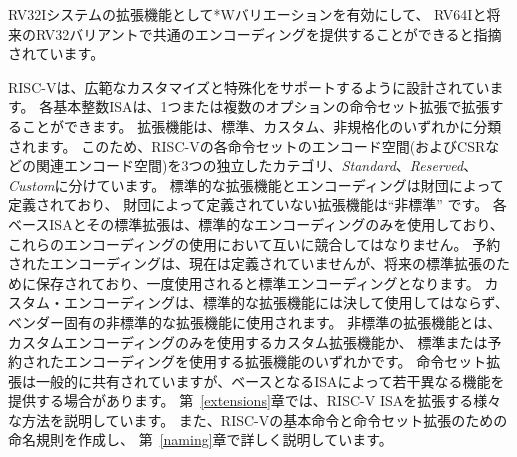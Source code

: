 \begin{commentary}
RV32Iシステムの拡張機能として*Wバリエーションを有効にして、
RV64Iと将来のRV32バリアントで共通のエンコーディングを提供することができると指摘されています。
\end{commentary}

\begin{comment}
RISC-V has been designed to support extensive customization and
specialization.  Each base integer ISA can be extended with one or
more optional instruction-set extensions.  An extension may be
categorized as either standard, custom, or non-conforming.
For this purpose, we divide each RISC-V
instruction-set encoding space (and related encoding spaces such as
the CSRs) into three disjoint categories: {\em standard}, {\em
  reserved}, and {\em custom}.  Standard extensions and encodings
are defined by the Foundation; any extensions not defined by the
Foundation are {\em non-standard}.
Each base ISA and its standard extensions use only standard encodings,
and shall not conflict with each other in their uses of these encodings.
Reserved encodings are currently not defined but are saved for future
standard extensions; once thus used, they become standard encodings.
Custom encodings shall never be used for standard extensions and are
made available for vendor-specific non-standard extensions.
Non-standard extensions are either custom extensions, that use only
custom encodings, or {\em non-conforming} extensions, that use any
standard or reserved encoding.
Instruction-set extensions are generally shared but may provide slightly different
functionality depending on the base ISA.  Chapter~\ref{extensions}
describes various ways of extending the RISC-V ISA.  We have also
developed a naming convention for RISC-V base instructions and
instruction-set extensions, described in detail in
Chapter~\ref{naming}.
\end{comment}

RISC-Vは、広範なカスタマイズと特殊化をサポートするように設計されています。
各基本整数ISAは、1つまたは複数のオプションの命令セット拡張で拡張することができます。
拡張機能は、標準、カスタム、非規格化のいずれかに分類されます。
このため、RISC-Vの各命令セットのエンコード空間(およびCSRなどの関連エンコード空間)を3つの独立したカテゴリ、{\em Standard}、{\em Reserved}、{\em Custom}に分けています。
標準的な拡張機能とエンコーディングは財団によって定義されており、
財団によって定義されていない拡張機能は``非標準'' です。
各ベースISAとその標準拡張は、標準的なエンコーディングのみを使用しており、これらのエンコーディングの使用において互いに競合してはなりません。
予約されたエンコーディングは、現在は定義されていませんが、将来の標準拡張のために保存されており、一度使用されると標準エンコーディングとなります。
カスタム・エンコーディングは、標準的な拡張機能には決して使用してはならず、ベンダー固有の非標準的な拡張機能に使用されます。
非標準の拡張機能とは、カスタムエンコーディングのみを使用するカスタム拡張機能か、
標準または予約されたエンコーディングを使用する拡張機能のいずれかです。
命令セット拡張は一般的に共有されていますが、ベースとなるISAによって若干異なる機能を提供する場合があります。
第~\ref{extensions}章では、RISC-V ISAを拡張する様々な方法を説明しています。
また、RISC-Vの基本命令と命令セット拡張のための命名規則を作成し、
第~\ref{naming}章で詳しく説明しています。

